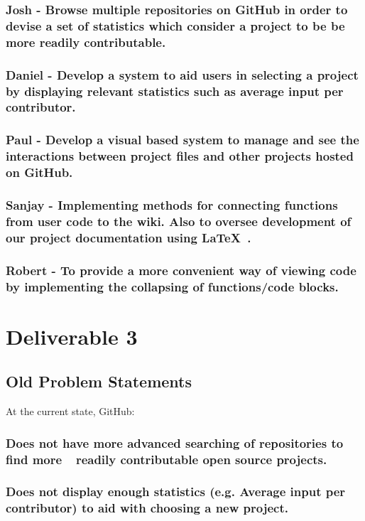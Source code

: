 \documentclass[12pt]{article}
\begin{document}
\subsubsection{\textnormal{Josh - Browse multiple repositories on \textsf{GitHub} in order to devise a set of statistics which consider a project to be be more readily contributable.}} 
\subsubsection{\textnormal{Daniel - Develop a system to aid users in selecting a project by displaying relevant statistics such as average input per contributor.}}   
\subsubsection{\textnormal{Paul - Develop a visual based system to manage and see the interactions between project files and other projects hosted on \textsf{GitHub}.}} 
\subsubsection{\textnormal{ Sanjay - Implementing methods for connecting functions from user code to the wiki. Also to oversee development of our project documentation using \LaTeX\ .}}
\subsubsection{\textnormal{Robert - To provide a more convenient way of viewing code by implementing the collapsing of functions/code blocks.}} 

\pagebreak
\setcounter{section}{3}
\setcounter{subsection}{0}
\section*{Deliverable 3}
\subsection{Old Problem Statements}
At the current state, \textsf{GitHub}:
\subsubsection{\textnormal{Does not have more advanced searching of repositories to find more $~~$ readily contributable open source projects.}}
\subsubsection{\textnormal{Does not display enough statistics (e.g. Average input per contributor) to aid with choosing a new project.} }
\end{document}
